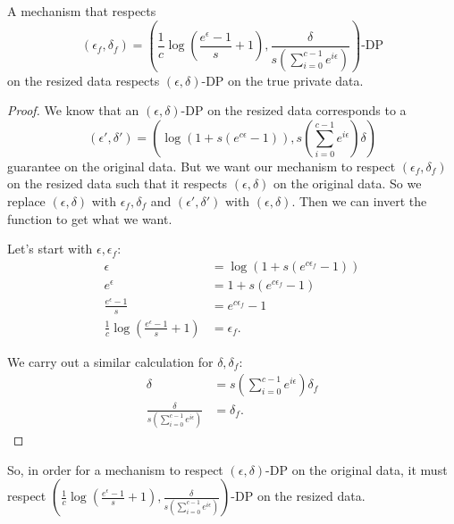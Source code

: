 \documentclass[11pt]{scrartcl} %
\begin{document}
\begin{theorem}
    A mechanism that respects 
    \[ (\epsilon_f, \delta_f) = \left( \frac{1}{c}\log\left(\frac{e^{\epsilon}-1}{s} + 1 \right), \frac{\delta}{s\left(\sum_{i=0}^{c-1}e^{i \epsilon}\right)} \right)\text{-DP} \] 
    on the resized data respects $(\epsilon, \delta)$-DP on the true private data.
    \begin{proof}
        We know that an $(\epsilon, \delta)$-DP on the resized data corresponds to a 
        \[ (\epsilon', \delta') = \left(\log\left(1+s\left(e^{c\epsilon}-1\right) \right), s\left(\sum_{i=0}^{c-1}e^{i \epsilon}\right)\delta \right) \]
        guarantee on the original data. But we want our mechanism to respect $(\epsilon_f, \delta_f)$ on the resized data such that it 
        respects $(\epsilon, \delta)$ on the original data. So we replace $(\epsilon, \delta)$ with 
        $\epsilon_f, \delta_f$ and $(\epsilon', \delta')$ with $(\epsilon, \delta)$. 
        Then we can invert the function to get what we want. \newline 

        Let's start with $\epsilon, \epsilon_f$:
        \begin{align*}
            \epsilon &= \log\left(1+s\left(e^{c\epsilon_f}-1\right)\right) \\
            e^{\epsilon} &= 1+s\left(e^{c\epsilon_f}-1\right) \\
            \frac{e^{\epsilon}-1}{s} &= e^{c\epsilon_f}-1 \\
            \frac{1}{c}\log\left(\frac{e^{\epsilon}-1}{s} + 1 \right) &= \epsilon_f.
        \end{align*}

        We carry out a similar calculation for $\delta, \delta_f$:
        \begin{align*}
            \delta &= s\left(\sum_{i=0}^{c-1}e^{i \epsilon}\right)\delta_f \\
            \frac{\delta}{s\left(\sum_{i=0}^{c-1}e^{i \epsilon}\right)} &= \delta_f.
        \end{align*}
    \end{proof} 
    So, in order for a mechanism to respect $(\epsilon, \delta)$-DP on the original data, it must respect 
    $\left( \frac{1}{c}\log\left(\frac{e^{\epsilon}-1}{s} + 1 \right), \frac{\delta}{s\left(\sum_{i=0}^{c-1}e^{i \epsilon}\right)} \right)$-DP 
    on the resized data.
\end{theorem}
\end{document}
